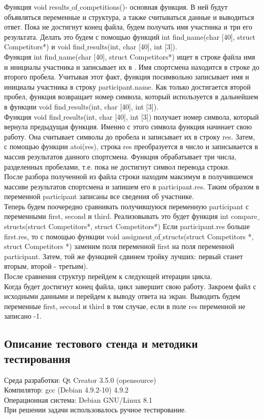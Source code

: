 \documentclass[12pt,a4paper]{report}
\begin{document}
Функция void results$\_$of$\_$competitions()- основная функция. В ней будут объявляться переменные и структура, а также считываться данные и выводиться ответ. Пока не достигнут конец файла, будем получать имя участника и три его результата. Делать это будем с помощью функций int find$\_$name(char [40], struct Competitors*) и void find$\_$results(int, char [40], int [3]).\\
Функция int find$\_$name(char [40], struct Competitors*) ищет в строке файла имя и инициалы участника и записывает их в . Имя спортсмена находится в строке до второго пробела. Учитывая этот факт, функция посимвольно записывает имя и инициалы участника в строку participant.name. Как только достигается второй пробел, функция возвращает номер символа, который используется в дальнейшем в функции void find$\_$results(int, char [40], int [3]).\\
Функция void find$\_$results(int, char [40], int [3]) получает номер символа, который вернула предыдущая функция. Именно с этого символа функция начинает свою работу. Она считывает символы до пробела и записывает их в строку res. Затем, с помощью функции atoi(res), строка res преобразуется в число и записывается в массив результатов данного спортсмена. Функция обрабатывает три числа, разделенных пробелами, т.е. пока не достигнут символ перевода строки. \\
После разбора полученной из файла строки находим максимум в получившемся массиве результатов спортсмена и запишем его в participant.res. Таким образом в переменной participant записаны все сведения об участнике. \\
Теперь будем поочередно сравнивать получившуюся переменную participant с переменными first, second и third. Реализовывать это будет функция int compare$\_$structs(struct Competitors*, struct Competitors*) Если participant.res больше first.res, то с помощью функции void assigment$\_$of$\_$structs(struct Competitors *, struct Competitors *) заменим поля переменной first на поля переменной participant. Затем, той же функцией сдвинем тройку лучших: первый станет вторым, второй - третьим). \\
После сравнения структур перейдем к следующей итерации цикла. \\
Когда будет достигнут конец файла, цикл завершит свою работу. Закроем файл с исходными данными и перейдем к выводу ответа на экран. Выводить будем переменные first, second и third в том случае, если в поле res переменной не записано -1. 
\subsection{Описание тестового стенда и методики тестирования}
Среда разработки: Qt Creator 3.5.0 (opensource)\\
Компилятор: gcc (Debian 4.9.2-10) 4.9.2 \\
Операционная система: Debian GNU/Linux 8.1 \\
При решении задачи использовалось ручное тестирование. 
\end{document}

